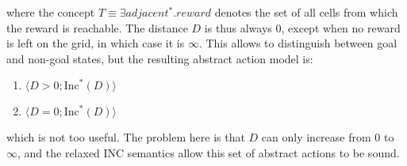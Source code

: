 \documentclass[12pt]{article}
\newcommand{\tuple}[1]{\ensuremath{\langle #1 \rangle}}
\newcommand{\RInc}{\ensuremath{\text{Inc}^*}}  %
\begin{document}
\noindent where the concept $T \equiv \exists adjacent^*.reward$ denotes the set of all cells from which the reward is reachable.
The distance $D$ is thus always $0$, except when no reward is left on the grid, in which case it is $\infty$. This allows to distinguish between goal
and non-goal states, but the resulting abstract action model is:
\begin{enumerate}
 \item $\tuple{D>0; \RInc(D)}$
 \item $\tuple{D=0; \RInc(D)}$
\end{enumerate}

which is not too useful. The problem here is that $D$ can only increase from $0$ to $\infty$, and the relaxed INC semantics
allow this set of abstract actions to be sound.



{
\small


}
\end{document}
